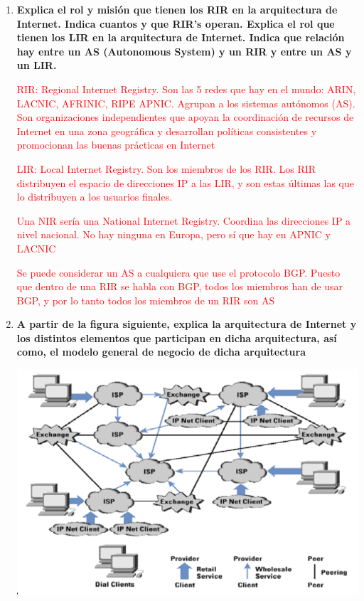 \documentclass[a4paper,10pt]{article}
\newcommand{\red}[1]{\textcolor{red}{#1}}
\begin{document}
\begin{enumerate}
  \item \textbf{Explica el rol y misión que tienen los RIR en la arquitectura de Internet. Indica cuantos y
que RIR’s operan. Explica el rol que tienen los LIR en la arquitectura de Internet. Indica que
relación hay entre un AS (Autonomous System) y un RIR y entre un AS y un LIR.}

\red{
RIR: Regional Internet Registry. Son las 5 redes que hay en el mundo: ARIN, LACNIC, AFRINIC, RIPE APNIC. Agrupan a los sistemas autónomos (AS). Son organizaciones independientes que apoyan la coordinación de recursos de Internet en una zona geográfica y desarrollan políticas consistentes y promocionan las buenas prácticas en Internet
}

\red{
LIR: Local Internet Registry. Son los miembros de los RIR. Los RIR distribuyen el espacio de direcciones IP a las LIR, y son estas últimas las que lo distribuyen a los usuarios finales.
}

\red{
Una NIR sería una National Internet Registry. Coordina las direcciones IP a nivel nacional. No hay ninguna en Europa, pero sí que hay en APNIC y LACNIC
}

\red{
Se puede considerar un AS a cualquiera que use el protocolo BGP. Puesto que dentro de una RIR se habla con BGP, todos los miembros han de usar BGP, y por lo tanto todos los miembros de un RIR son AS
}




  \item \textbf{A partir de la figura siguiente, explica la arquitectura de Internet y los distintos elementos
que participan en dicha arquitectura, así como, el modelo general de negocio de dicha arquitectura}

\includegraphics{p2}


\end{enumerate}
\end{document}

